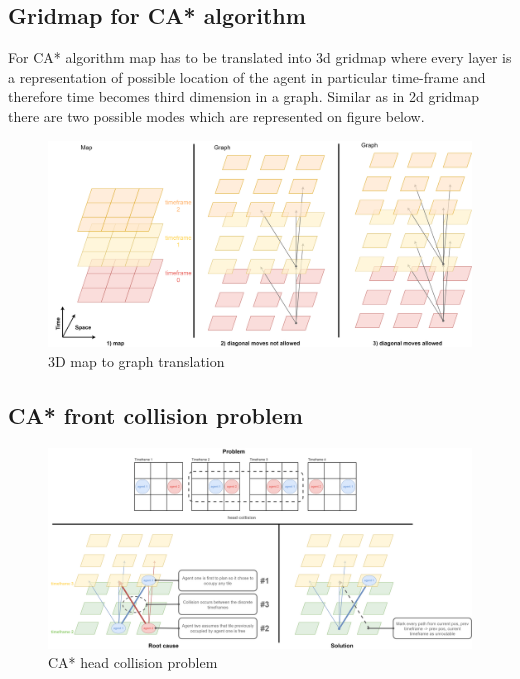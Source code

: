 \subsection{Gridmap for CA* algorithm}
For CA* algorithm map has to be translated into 3d gridmap where every layer is a representation of possible location of the agent in particular time-frame and therefore time becomes third dimension in a graph. Similar as in 2d gridmap there are two possible modes which are represented on figure below.
\begin{figure}[H]
    \centering
    \includegraphics[width=\textwidth]{pictures/map_3D.png}
    \caption{ 3D map to graph translation }
    \label{fig:map_3D}
\end{figure}

\subsection{CA* front collision problem}

\begin{figure}[H]
    \centering
    \includegraphics[width=\textwidth]{pictures/head_collision_problem.png}
    \caption{ CA* head collision problem}
    \label{fig:head_collision}
\end{figure}